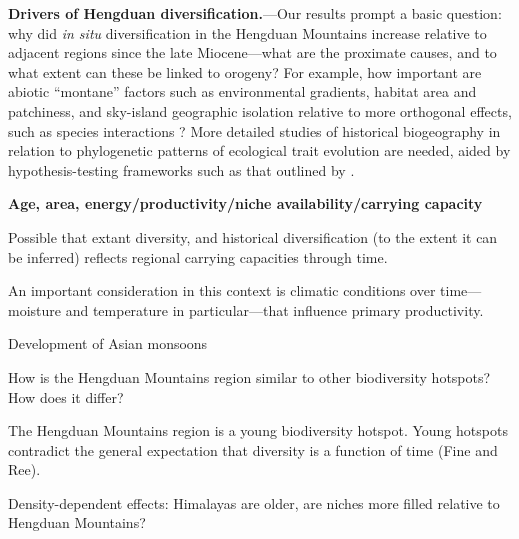 
\textbf{Drivers of Hengduan diversification.}---Our results prompt a basic question: why did \textit{in situ} diversification in the Hengduan Mountains increase relative to adjacent regions since the late Miocene---what are the proximate causes, and to what extent can these be linked to orogeny? For example, how important are abiotic ``montane'' factors such as environmental gradients, habitat area and patchiness, and sky-island geographic isolation \citep{Hughes2015} relative to more orthogonal effects, such as species interactions \citep[e.g.,][]{eaton2012}? More detailed studies of historical biogeography in relation to phylogenetic patterns of ecological trait evolution are needed, aided by hypothesis-testing frameworks such as that outlined by \citet{Favre2015}.

\textbf{Age, area, energy/productivity/niche availability/carrying capacity}

Possible that extant diversity, and historical diversification (to the extent it can be inferred) reflects regional carrying capacities through time.

An important consideration in this context is climatic conditions over time---moisture and temperature in particular---that influence primary productivity.

Development of Asian monsoons

How is the Hengduan Mountains region similar to other biodiversity hotspots? How does it differ?

The Hengduan Mountains region is a young biodiversity hotspot. Young hotspots contradict the general expectation that diversity is a function of time (Fine and Ree).



Density-dependent effects: Himalayas are older, are niches more filled relative to Hengduan Mountains?

